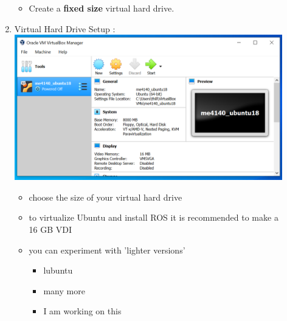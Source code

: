 \documentclass[12pt]{article}
\begin{document}
\begin{description}
\begin{enumerate}
\begin{itemize}
                \item Create a {\bf fixed size} virtual hard drive. 
                              
            \end{itemize}
	\newpage

\newpage
\item Virtual Hard Drive Setup : \vspace{20mm} \\
      		\hspace*{-2.5cm}\includegraphics[scale=.6]{Capture9.png}\\
             \begin{itemize}
                    
                \item choose the size of your virtual hard drive       
                \item to virtualize Ubuntu and install ROS it is recommended to make a 16 GB VDI
                \item  you can experiment with 'lighter versions' 
          
                    \begin{itemize}
                            
                        \item lubuntu     
                        \item many more
                        \item I am working on this
                        
                    \end{itemize}
                
            \end{itemize}
	\newpage

\end{enumerate}


\end{description}
\end{document}
